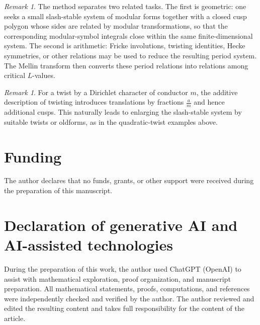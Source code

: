 \documentclass[preprint,12pt]{elsarticle}
\theoremstyle{definition}
\theoremstyle{remark}
\newtheorem{remark}[theorem]{Remark}
\begin{document}
\begin{remark}
	The method separates two related tasks. The first is geometric: one seeks a small slash-stable system of modular forms together with a closed cusp polygon whose sides are related by modular transformations, so that the corresponding modular-symbol integrals close within the same finite-dimensional system. The second is arithmetic: Fricke involutions, twisting identities, Hecke symmetries, or other relations may be used to reduce the resulting period system. The Mellin transform then converts these period relations into relations among critical $L$-values.
\end{remark}

\begin{remark}
	For a twist by a Dirichlet character of conductor $m$, the additive description of twisting introduces translations by fractions $\frac{a}{m}$ and hence additional cusps. This naturally leads to enlarging the slash-stable system by suitable twists or oldforms, as in the quadratic-twist examples above.
\end{remark}



	
\section*{Funding}

The author declares that no funds, grants, or other support were received during the preparation of this manuscript.	

\section*{Declaration of generative AI and AI-assisted technologies}

During the preparation of this work, the author used ChatGPT (OpenAI)
to assist with mathematical exploration, proof organization, and manuscript
preparation. All mathematical statements, proofs, computations, and
references were independently checked and verified by the author. The
author reviewed and edited the resulting content and takes full
responsibility for the content of the article.
\nocite{*}


\end{document}
